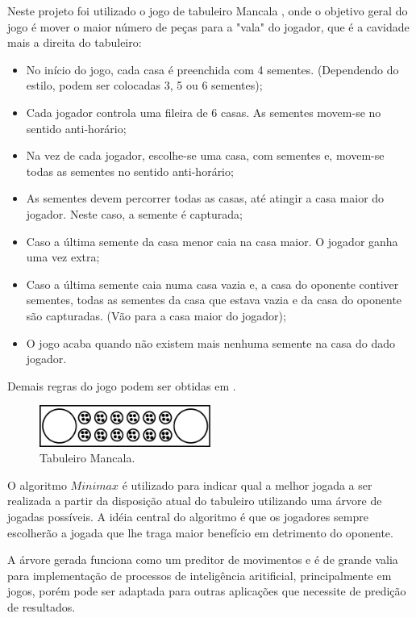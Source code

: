 \documentclass[a4paper,11pt]{article}
\begin{document}
Neste projeto foi utilizado o jogo de tabuleiro Mancala\cite{MANCALA, KALAH} , onde o objetivo geral do jogo é mover o maior número de peças para a "vala" do jogador, que é a cavidade mais a direita do tabuleiro:
\begin{itemize}
  \item No início do jogo, cada casa é preenchida com 4 sementes. (Dependendo do estilo, podem ser colocadas 3, 5 ou 6 sementes);
  \item Cada jogador controla uma fileira de 6 casas. As sementes movem-se no sentido anti-horário;
  \item Na vez de cada jogador, escolhe-se uma casa, com sementes e, movem-se todas as sementes no sentido anti-horário;
  \item As sementes devem percorrer todas as casas, até atingir a casa maior do jogador. Neste caso, a semente é capturada;
  \item Caso a última semente da casa menor caia na casa maior. O jogador ganha uma vez extra;
  \item Caso a última semente caia numa casa vazia e, a casa do oponente contiver sementes, todas as sementes da casa que estava vazia e da casa do oponente são capturadas. (Vão para a casa maior do jogador);
  \item O jogo acaba quando não existem mais nenhuma semente na casa do dado jogador.
\end{itemize}
Demais regras do jogo podem ser obtidas em \cite{MANCALA, KALAH}.
\begin{figure}[h!]
    \includegraphics[width=0.5\textwidth]{mancala.pdf}
  \centering
  \caption{Tabuleiro Mancala.}
  \centering

\end{figure}

O algoritmo $Minimax$\cite{MINIMAX} é utilizado para indicar qual a melhor jogada a ser realizada a partir da disposição atual do tabuleiro utilizando uma árvore de jogadas possíveis. A idéia central do algoritmo é que os jogadores sempre escolherão a jogada que lhe traga maior benefício em detrimento do oponente.

A árvore gerada funciona como um preditor de movimentos e é de grande valia para implementação de processos de inteligência aritificial, principalmente em jogos, porém pode ser adaptada para outras aplicações que necessite de predição de resultados.
\end{document}

